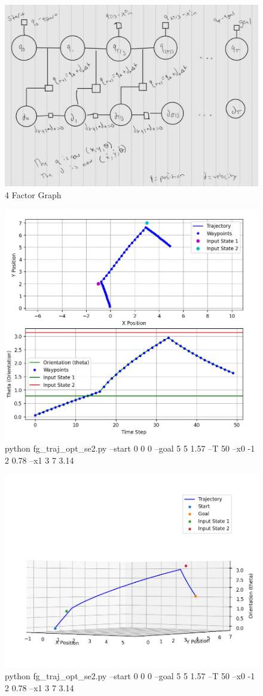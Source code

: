 \documentclass{article}
\begin{document}
\begin{figure} [H]
    \centering
    \includegraphics[width=0.5\linewidth]{latex_media/fg_traj_opt_se2_factorGraph.jpg}
    \caption{4 Factor Graph}
    \label{fig:enter-label}
\end{figure}

\begin{figure} [H]
    \centering
    \includegraphics[width=0.5\linewidth]{latex_media/fg_traj_opt_se2_1.jpg}
    \caption{python fg\_traj\_opt\_se2.py --start 0 0 0 --goal 5 5 1.57 --T 50 --x0 -1 2 0.78 --x1 3 7 3.14}
\end{figure}

\begin{figure} [H]
    \centering
    \includegraphics[width=0.5\linewidth]{latex_media/fg_traj_opt_se2_11.jpg}
    \caption{python fg\_traj\_opt\_se2.py --start 0 0 0 --goal 5 5 1.57 --T 50 --x0 -1 2 0.78 --x1 3 7 3.14}
    
\end{figure}
\end{document}
